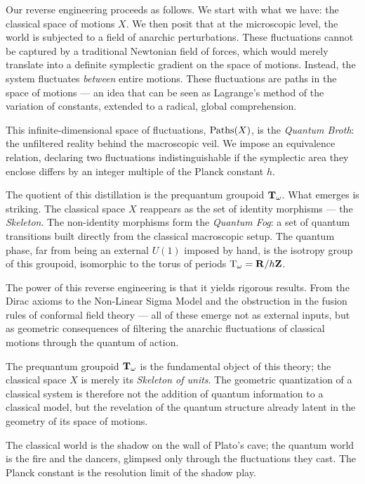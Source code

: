 \documentclass[10pt,reqno,letterpaper,twoside]{amsbook}
\begin{document}
  Our reverse engineering proceeds as follows.
  We start with what we have:
  the classical space of motions $X$.
  We then posit that at the microscopic level,
  the world is subjected to a field of anarchic perturbations.
  These fluctuations cannot be captured by a traditional Newtonian field of forces,
  which would merely translate into a definite symplectic gradient on the space of motions.
  Instead,
  the system fluctuates \emph{between} entire motions.
  These fluctuations are paths in the space of motions ---
  an idea that can be seen as Lagrange's method of the variation of constants,
  extended to a radical,
  global comprehension.
  
  This infinite-dimensional space of fluctuations,
  $\operatorname{Paths}(X)$,
  is the \emph{Quantum Broth}:
  the unfiltered reality behind the macroscopic veil.
  We impose an equivalence relation,
  declaring two fluctuations indistinguishable
  if the symplectic area they enclose differs by an integer multiple of the Planck constant $h$.
  
  The quotient of this distillation is the prequantum groupoid ${\mathbf T}_\omega$.
  What emerges is striking.
  The classical space $X$ reappears as the set of identity morphisms ---
  the \emph{Skeleton}.
  The non-identity morphisms form the \emph{Quantum Fog}:
  a set of quantum transitions built directly from the classical macroscopic setup.
  The quantum phase,
  far from being an external $U(1)$ imposed by hand,
  is the isotropy group of this groupoid,
  isomorphic to the torus of periods $\mathrm{T}_\omega = {\mathbf{R}}/h{\mathbf{Z}}$.
  
  The power of this reverse engineering is that it yields rigorous results.
  From the Dirac axioms
  to the Non-Linear Sigma Model and the obstruction in the fusion rules of conformal field theory ---
  all of these emerge not as external inputs,
  but as geometric consequences of filtering
  the anarchic fluctuations of classical motions
  through the quantum of action.
  
  The prequantum groupoid ${\mathbf T}_\omega$ is the fundamental object of this theory;
  the classical space $X$ is merely its \emph{Skeleton of units}.
  The geometric quantization of a classical system
  is therefore not the addition of quantum information to a classical model,
  but the revelation of the quantum structure
  already latent in the geometry of its space of motions.
  
  The classical world is the shadow on the wall of Plato's cave;
  the quantum world is the fire and the dancers,
  glimpsed only through the fluctuations they cast.
  The Planck constant is the resolution limit of the shadow play.
  
\end{document}
